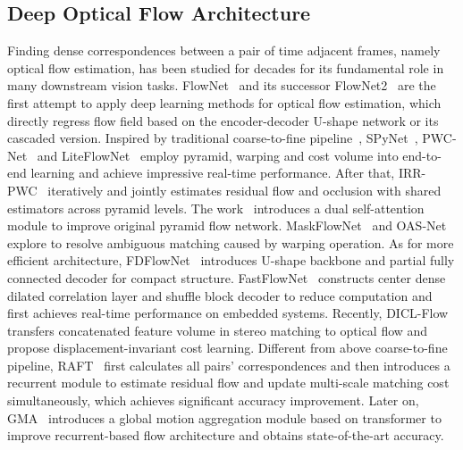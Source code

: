 \documentclass[lettersize,journal]{IEEEtran}
\begin{document}
\subsection{Deep Optical Flow Architecture}
Finding dense correspondences between a pair of time adjacent frames, namely optical flow estimation, has been studied for decades for its fundamental role in many downstream vision tasks. FlowNet~\cite{7410673} and its successor FlowNet2~\cite{8099662} are the first attempt to apply deep learning methods for optical flow estimation, which directly regress flow field based on the encoder-decoder U-shape network or its cascaded version. Inspired by traditional coarse-to-fine pipeline~\cite{5206697,7780984,8434339}, SPyNet~\cite{8099774}, PWC-Net~\cite{8579029} and LiteFlowNet~\cite{8579034} employ pyramid, warping and cost volume into end-to-end learning and achieve impressive real-time performance. After that, IRR-PWC~\cite{Hur:2019:IRR} iteratively and jointly estimates residual flow and occlusion with shared estimators across pyramid levels. The work~\cite{8846749} introduces a dual self-attention module to improve original pyramid flow network. MaskFlowNet~\cite{zhao2020maskflownet} and OAS-Net~\cite{9413531} explore to resolve ambiguous matching caused by warping operation. As for more efficient architecture, FDFlowNet~\cite{9191101} introduces U-shape backbone and partial fully connected decoder for compact structure. FastFlowNet~\cite{Kong_2021_ICRA} constructs center dense dilated correlation layer and shuffle block decoder to reduce computation and first achieves real-time performance on embedded systems. Recently, DICL-Flow~\cite{NEURIPS2020_add5aebf} transfers concatenated feature volume in stereo matching to optical flow and propose displacement-invariant cost learning. Different from above coarse-to-fine pipeline, RAFT~\cite{teed2020raft} first calculates all pairs' correspondences and then introduces a recurrent module to estimate residual flow and update multi-scale matching cost simultaneously, which achieves significant accuracy improvement. Later on, GMA~\cite{Jiang_2021_ICCV} introduces a global motion aggregation module based on transformer to improve recurrent-based flow architecture and obtains state-of-the-art accuracy.
\end{document}

